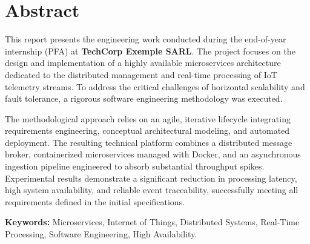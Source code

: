 \chapter*{Abstract}

\noindent
This report presents the engineering work conducted during the end-of-year internship (PFA) at \textbf{TechCorp Exemple SARL}. The project focuses on the design and implementation of a highly available microservices architecture dedicated to the distributed management and real-time processing of IoT telemetry streams. To address the critical challenges of horizontal scalability and fault tolerance, a rigorous software engineering methodology was executed.

\vspace{0.4cm}

\noindent
The methodological approach relies on an agile, iterative lifecycle integrating requirements engineering, conceptual architectural modeling, and automated deployment. The resulting technical platform combines a distributed message broker, containerized microservices managed with Docker, and an asynchronous ingestion pipeline engineered to absorb substantial throughput spikes. Experimental results demonstrate a significant reduction in processing latency, high system availability, and reliable event traceability, successfully meeting all requirements defined in the initial specifications.

\vspace{0.8cm}

\noindent
\textbf{Keywords:} Microservices, Internet of Things, Distributed Systems, Real-Time Processing, Software Engineering, High Availability.
